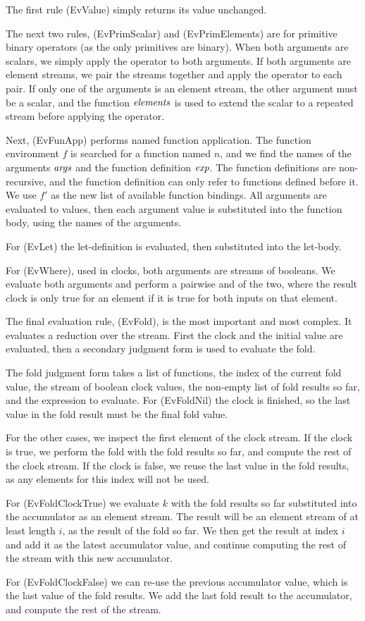 The first rule (EvValue) simply returns its value unchanged.

The next two rules, (EvPrimScalar) and (EvPrimElements) are for primitive binary operators (as the only primitives are binary).
When both arguments are scalars, we simply apply the operator to both arguments.
If both arguments are element streams, we pair the streams together and apply the operator to each pair.
If only one of the arguments is an element stream, the other argument must be a scalar, and the function $\mathit{elements}$ is used to extend the scalar to a repeated stream before applying the operator.

Next, (EvFunApp) performs named function application.
The function environment $f$ is searched for a function named $n$, and we find the names of the arguments $\mathit{args}$ and the function definition $\mathit{exp}$.
The function definitions are non-recursive, and the function definition can only refer to functions defined before it.
We use $f'$ as the new list of available function bindings.
All arguments are evaluated to values, then each argument value is substituted into the function body, using the names of the arguments.

For (EvLet) the let-definition is evaluated, then substituted into the let-body.

For (EvWhere), used in clocks, both arguments are streams of booleans.
We evaluate both arguments and perform a pairwise and of the two, where the result clock is only true for an element if it is true for both inputs on that element.

The final evaluation rule, (EvFold), is the most important and most complex.
It evaluates a reduction over the stream.
First the clock and the initial value are evaluated, then a secondary judgment form is used to evaluate the fold.

The fold judgment form takes a list of functions, the index of the current fold value, the stream of boolean clock values, the non-empty list of fold results so far, and the expression to evaluate.
For (EvFoldNil) the clock is finished, so the last value in the fold result must be the final fold value.

For the other cases, we inspect the first element of the clock stream.
If the clock is true, we perform the fold with the fold results so far, and compute the rest of the clock stream.
If the clock is false, we reuse the last value in the fold results, as any elements for this index will not be used.

For (EvFoldClockTrue) we evaluate $k$ with the fold results so far substituted into the accumulator as an element stream.
The result will be an element stream of at least length $i$, as the result of the fold so far.
We then get the result at index $i$ and add it as the latest accumulator value, and continue computing the rest of the stream with this new accumulator.

For (EvFoldClockFalse) we can re-use the previous accumulator value, which is the last value of the fold results.
We add the last fold result to the accumulator, and compute the rest of the stream.




